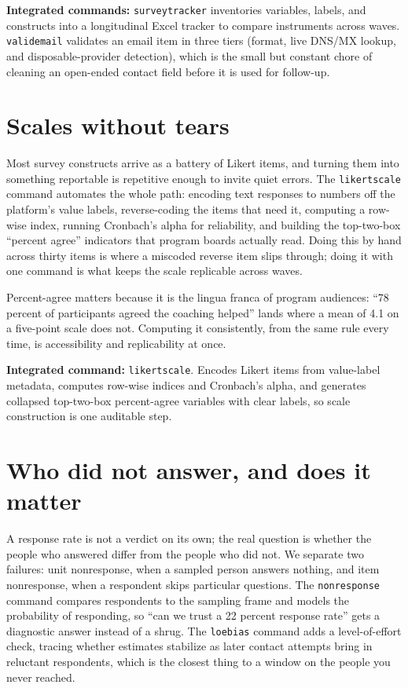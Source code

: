 \documentclass[
    a4paper,
    fontsize=10pt,
    twoside=true,
    numbers=noenddot,
]{kaobook}
\begin{document}
\begin{kaobox}[frametitle=Package Integration: \texttt{surveytracker} and \texttt{validemail}]
\textbf{Integrated commands:} \texttt{surveytracker} inventories variables, labels, and constructs into a longitudinal Excel tracker to compare instruments across waves. \texttt{validemail} validates an email item in three tiers (format, live DNS/MX lookup, and disposable-provider detection), which is the small but constant chore of cleaning an open-ended contact field before it is used for follow-up.
\end{kaobox}

\section{Scales without tears}
Most survey constructs arrive as a battery of Likert items, and turning them into something reportable is repetitive enough to invite quiet errors. The \texttt{likertscale} command automates the whole path: encoding text responses to numbers off the platform's value labels, reverse-coding the items that need it, computing a row-wise index, running Cronbach's alpha for reliability, and building the top-two-box \enquote{percent agree} indicators that program boards actually read. Doing this by hand across thirty items is where a miscoded reverse item slips through; doing it with one command is what keeps the scale replicable across waves.

Percent-agree matters because it is the lingua franca of program audiences: \enquote{78 percent of participants agreed the coaching helped} lands where a mean of 4.1 on a five-point scale does not. Computing it consistently, from the same rule every time, is accessibility and replicability at once.

\begin{kaobox}[frametitle=Package Integration: \texttt{likertscale}]
\textbf{Integrated command:} \texttt{likertscale}. Encodes Likert items from value-label metadata, computes row-wise indices and Cronbach's alpha, and generates collapsed top-two-box percent-agree variables with clear labels, so scale construction is one auditable step.
\end{kaobox}

\section{Who did not answer, and does it matter}
A response rate is not a verdict on its own; the real question is whether the people who answered differ from the people who did not. We separate two failures: unit nonresponse, when a sampled person answers nothing, and item nonresponse, when a respondent skips particular questions. The \texttt{nonresponse} command compares respondents to the sampling frame and models the probability of responding, so \enquote{can we trust a 22 percent response rate} gets a diagnostic answer instead of a shrug. The \texttt{loebias} command adds a level-of-effort check, tracing whether estimates stabilize as later contact attempts bring in reluctant respondents, which is the closest thing to a window on the people you never reached.
\end{document}
